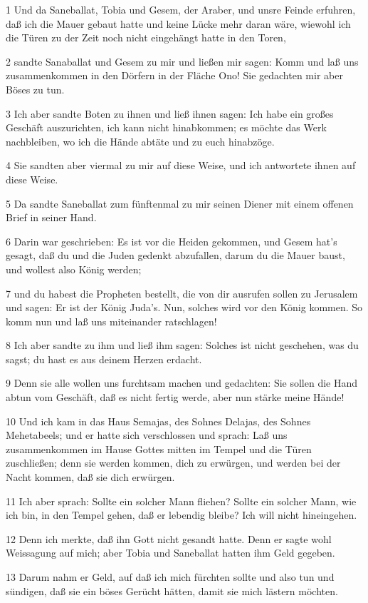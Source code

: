 \par 1 Und da Saneballat, Tobia und Gesem, der Araber, und unsre Feinde erfuhren, daß ich die Mauer gebaut hatte und keine Lücke mehr daran wäre, wiewohl ich die Türen zu der Zeit noch nicht eingehängt hatte in den Toren,
\par 2 sandte Sanaballat und Gesem zu mir und ließen mir sagen: Komm und laß uns zusammenkommen in den Dörfern in der Fläche Ono! Sie gedachten mir aber Böses zu tun.
\par 3 Ich aber sandte Boten zu ihnen und ließ ihnen sagen: Ich habe ein großes Geschäft auszurichten, ich kann nicht hinabkommen; es möchte das Werk nachbleiben, wo ich die Hände abtäte und zu euch hinabzöge.
\par 4 Sie sandten aber viermal zu mir auf diese Weise, und ich antwortete ihnen auf diese Weise.
\par 5 Da sandte Saneballat zum fünftenmal zu mir seinen Diener mit einem offenen Brief in seiner Hand.
\par 6 Darin war geschrieben: Es ist vor die Heiden gekommen, und Gesem hat's gesagt, daß du und die Juden gedenkt abzufallen, darum du die Mauer baust, und wollest also König werden;
\par 7 und du habest die Propheten bestellt, die von dir ausrufen sollen zu Jerusalem und sagen: Er ist der König Juda's. Nun, solches wird vor den König kommen. So komm nun und laß uns miteinander ratschlagen!
\par 8 Ich aber sandte zu ihm und ließ ihm sagen: Solches ist nicht geschehen, was du sagst; du hast es aus deinem Herzen erdacht.
\par 9 Denn sie alle wollen uns furchtsam machen und gedachten: Sie sollen die Hand abtun vom Geschäft, daß es nicht fertig werde, aber nun stärke meine Hände!
\par 10 Und ich kam in das Haus Semajas, des Sohnes Delajas, des Sohnes Mehetabeels; und er hatte sich verschlossen und sprach: Laß uns zusammenkommen im Hause Gottes mitten im Tempel und die Türen zuschließen; denn sie werden kommen, dich zu erwürgen, und werden bei der Nacht kommen, daß sie dich erwürgen.
\par 11 Ich aber sprach: Sollte ein solcher Mann fliehen? Sollte ein solcher Mann, wie ich bin, in den Tempel gehen, daß er lebendig bleibe? Ich will nicht hineingehen.
\par 12 Denn ich merkte, daß ihn Gott nicht gesandt hatte. Denn er sagte wohl Weissagung auf mich; aber Tobia und Saneballat hatten ihm Geld gegeben.
\par 13 Darum nahm er Geld, auf daß ich mich fürchten sollte und also tun und sündigen, daß sie ein böses Gerücht hätten, damit sie mich lästern möchten.
